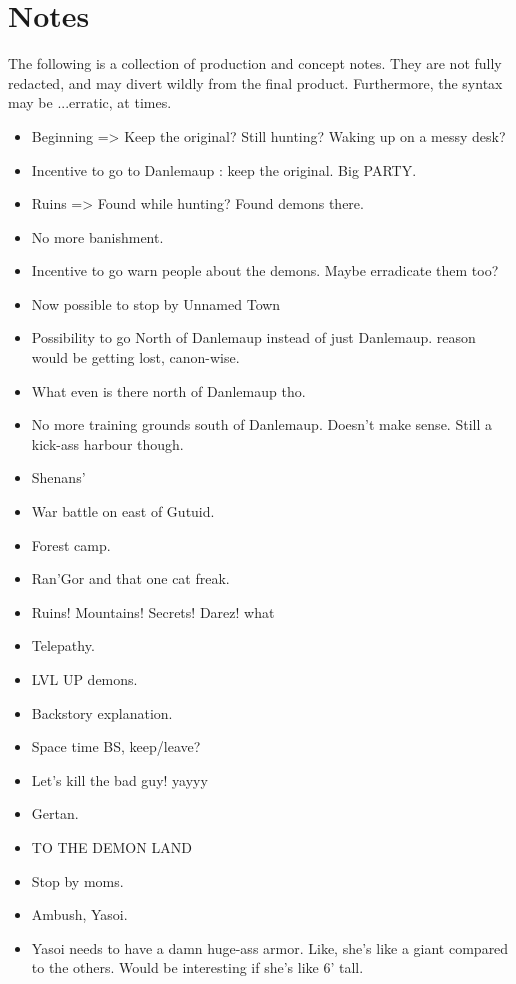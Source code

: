 \documentclass[a4paper,12pt]{book}
\begin{document}
		\chapter{Notes}
			The following is a collection of production and concept notes. They are not fully redacted, and may divert wildly from the final product. Furthermore, the syntax may be ...erratic, at times.
			\begin{itemize}
				\item Beginning => Keep the original? Still hunting? Waking up on a messy desk?
				\item Incentive to go to Danlemaup : keep the original. Big PARTY.
				\item Ruins => Found while hunting? Found demons there.
				\item No more banishment.
				\item Incentive to go warn people about the demons. Maybe erradicate them too?
				\item Now possible to stop by Unnamed Town
				\item Possibility to go North of Danlemaup instead of just Danlemaup. reason would be getting lost, canon-wise.
				\item What even is there north of Danlemaup tho.
				\item No more training grounds south of Danlemaup. Doesn't make sense. Still a kick-ass harbour though.
				\item Shenans'
				\item War battle on east of Gutuid.
				\item Forest camp.
				\item Ran'Gor and that one cat freak.
				\item Ruins! Mountains! Secrets! Darez! what
				\item Telepathy.
				\item LVL UP demons.
				\item Backstory explanation.
				\item Space time BS, keep/leave?
				\item Let's kill the bad guy! yayyy
				\item Gertan.
				\item TO THE DEMON LAND
				\item Stop by moms.
				\item Ambush, Yasoi.
				\item Yasoi needs to have a damn huge-ass armor. Like, she's like a giant compared to the others. Would be interesting if she's like 6' tall.

\end{itemize}
\end{document}
